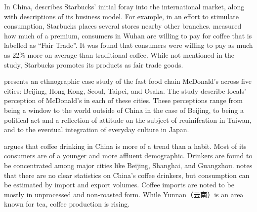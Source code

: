 In China, \textcite{harrison_exporting_2005} describes Starbucks' initial foray
into the international market, along with descriptions of its business model.
For example, in an effort to stimulate consumption, Starbucks places several
stores nearby other branches. \textcite{yang_consumer_2012} measured how much of
a premium, consumers in Wuhan are willing to pay for coffee that is labelled as
``Fair Trade''. It was found that consumers were willing to pay as much as 22\%
more on average than traditional coffee. While not mentioned in the study,
Starbucks promotes its products as fair trade goods.

\textcite{watson_golden_2006} presents an ethnographic case study of the fast
food chain McDonald's across five cities: Beijing, Hong Kong, Seoul, Taipei, and
Osaka. The study describe locals' perception of McDonald's in each of these
cities. These perceptions range from being a window to the world outside of
China in the case of Beijing, to being a political act and a reflection of
attitude on the subject of reuinifcation in Taiwan, and to the eventual
integration of everyday culture in Japan.

\textcite{zhang_coffee_2014} argues that coffee drinking in China is more of a
trend than a habit. Most of its consumers are of a younger and more affluent
demographic. Drinkers are found to be concentrated among major cities like
Beijing, Shanghai, and Guangzhou.
\textcite{international_coffee_council_coffee_2015} notes that there are no
clear statistics on China's coffee drinkers, but consumption can be estimated by
import and export volumes. Coffee imports are noted to be mostly in unprocessed
and non-roasted form. While Yunnan（云南）is an area known for tea, coffee
production is rising.

